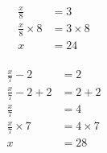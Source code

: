 \documentclass[12pt]{article}
\newcounter{minipagecount}
\begin{document}
\begin{multicols}{2}
\begin{minipage}[t]{0.45\textwidth}
\begin{align*}
        \frac{x}{8} &= 3\\
        \frac{x}{8} \times8 &= 3 \times8\\
        x &= 24\\
    \end{align*}
\end{minipage} %
\noindent{(\theminipagecount)}\hspace{0.1mm} %
\begin{minipage}[t]{0.45\textwidth} %
    \vspace{-26pt}  %
    \raggedright %
    \begin{align*} %
        \frac{x}{7} - 2 &= 2\\
        \frac{x}{7} - 2 + 2 &= 2 + 2\\
        \frac{x}{7} &= 4\\
        \frac{x}{7} \times7 &= 4 \times7\\
        x &= 28\\
    \end{align*}
\end{minipage} %
\noindent{(\theminipagecount)}\hspace{0.1mm} %
\begin{minipage}[t]{0.45\textwidth} %
    \vspace{-26pt}  %
    \raggedright %
    \begin{align*} %

\end{align*}
\end{minipage}
\end{multicols}
\end{document}
